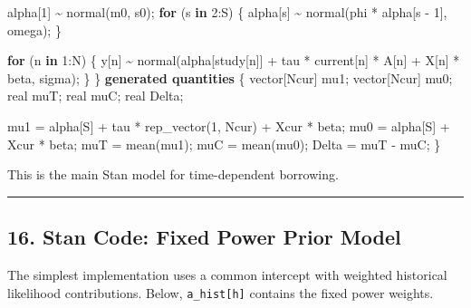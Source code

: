 \documentclass[
  letterpaper,
  DIV=11,
  numbers=noendperiod]{scrartcl}
\newenvironment{Shaded}{\begin{snugshade}}{\end{snugshade}}
\newcommand{\ControlFlowTok}[1]{\textcolor[rgb]{0.00,0.23,0.31}{\textbf{#1}}}
\newcommand{\DataTypeTok}[1]{\textcolor[rgb]{0.68,0.00,0.00}{#1}}
\newcommand{\DecValTok}[1]{\textcolor[rgb]{0.68,0.00,0.00}{#1}}
\newcommand{\KeywordTok}[1]{\textcolor[rgb]{0.00,0.23,0.31}{\textbf{#1}}}
\newcommand{\NormalTok}[1]{\textcolor[rgb]{0.00,0.23,0.31}{#1}}
\begin{document}
\begin{Shaded}
\begin{Highlighting}[]
\NormalTok{  alpha[}\DecValTok{1}\NormalTok{] \textasciitilde{} normal(m0, s0);}
  \ControlFlowTok{for}\NormalTok{ (s }\ControlFlowTok{in} \DecValTok{2}\NormalTok{:S) \{}
\NormalTok{    alpha[s] \textasciitilde{} normal(phi * alpha[s {-} }\DecValTok{1}\NormalTok{], omega);}
\NormalTok{  \}}

  \ControlFlowTok{for}\NormalTok{ (n }\ControlFlowTok{in} \DecValTok{1}\NormalTok{:N) \{}
\NormalTok{    y[n] \textasciitilde{} normal(alpha[study[n]] + tau * current[n] * A[n] + X[n] * beta, sigma);}
\NormalTok{  \}}
\NormalTok{\}}
\KeywordTok{generated quantities}\NormalTok{ \{}
  \DataTypeTok{vector}\NormalTok{[Ncur] mu1;}
  \DataTypeTok{vector}\NormalTok{[Ncur] mu0;}
  \DataTypeTok{real}\NormalTok{ muT;}
  \DataTypeTok{real}\NormalTok{ muC;}
  \DataTypeTok{real}\NormalTok{ Delta;}

\NormalTok{  mu1 = alpha[S] + tau * rep\_vector(}\DecValTok{1}\NormalTok{, Ncur) + Xcur * beta;}
\NormalTok{  mu0 = alpha[S] + Xcur * beta;}
\NormalTok{  muT = mean(mu1);}
\NormalTok{  muC = mean(mu0);}
\NormalTok{  Delta = muT {-} muC;}
\NormalTok{\}}
\end{Highlighting}
\end{Shaded}

This is the main Stan model for time-dependent borrowing.

\begin{center}\rule{0.5\linewidth}{0.5pt}\end{center}

\subsection{16. Stan Code: Fixed Power Prior
Model}\label{stan-code-fixed-power-prior-model}

The simplest implementation uses a common intercept with weighted
historical likelihood contributions. Below, \texttt{a\_hist{[}h{]}}
contains the fixed power weights.
\end{document}
